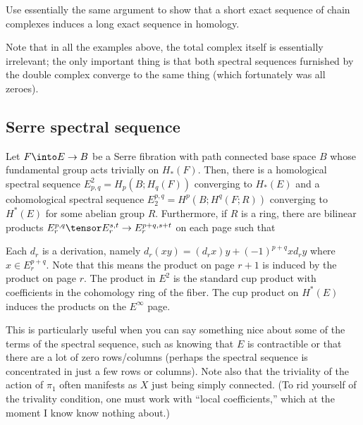\documentclass[10pt]{article}
\begin{document}
\begin{exercise}
    \label{exer:homology-LES}
    Use essentially the same argument to show that
    a short exact sequence of chain complexes
    induces a long exact sequence in homology.
\end{exercise}

Note that in all the examples above,
the total complex itself is essentially irrelevant;
the only important thing is that
both spectral sequences furnished by the double complex
converge to the same thing (which fortunately was all zeroes).

\subsection{Serre spectral sequence}

\begin{theorem}
    \label{thm:serre-ss}
    Let $F\into E\to B$ be a Serre fibration with
    path connected base space $B$ whose fundamental group
    acts trivially on $H_*(F)$.
    Then, there is a homological spectral sequence
    $E^2_{p,q} = H_p(B; H_q(F))$ converging to $H_*(E)$
    and a cohomological spectral sequence
    $E_2^{p,q} = H^p(B; H^q(F; R))$ converging to $H^*(E)$
    for some abelian group $R$.
    Furthermore, if $R$ is a ring, there are
    bilinear products $E^{p,q}_r\tensor E^{s,t}_r\to E^{p+q,s+t}_r$
    on each page such that
    \begin{enumerate}[(a)]
        \ii Each $d_r$ is a derivation, namely
	$d_r(xy) = (d_rx)y + (-1)^{p+q}xd_ry$ where $x\in E_r^{p+q}$.
	Note that this means the product on page $r+1$
	is induced by the product on page $r$.
	\ii The product in $E^2$ is the standard cup product
	with coefficients in the cohomology ring of the fiber.
	\ii The cup product on $H^*(E)$
	induces the products on the $E^\infty$ page.
    \end{enumerate}
\end{theorem}

This is particularly useful when you can say something nice
about some of the terms of the spectral sequence,
such as knowing that $E$ is contractible
or that there are a lot of zero rows/columns
(perhaps the spectral sequence is concentrated
in just a few rows or columns).
Note also that the triviality of the action of $\pi_1$
often manifests as $X$ just being simply connected.
(To rid yourself of the trivality condition,
one must work with ``local coefficients,'' which
at the moment I know know nothing about.)
\end{document}
